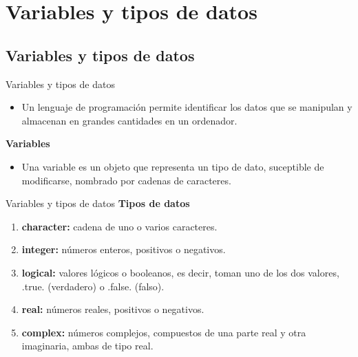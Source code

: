 
\section{Variables y tipos de datos}  


\subsection{Variables y tipos de datos}

\begin{frame}[fragile]{Variables y tipos de datos}
 \begin{itemize}[<+(0)->]
  \item Un lenguaje de programación permite identificar los datos que se manipulan y almacenan en grandes cantidades en un ordenador.
 \end{itemize}

\textbf{Variables}
 \begin{itemize}[<+(1)->]
  \item Una variable es un objeto que representa un tipo de dato, suceptible de modificarse, nombrado por cadenas de caracteres.
 \end{itemize}
\end{frame}

\begin{frame}[fragile]{Variables y tipos de datos}
\textbf{Tipos de datos}
 \begin{enumerate}[<+(1)->]
  \item \textbf{character:} cadena de uno o varios caracteres.
  \item \textbf{integer:} números enteros, positivos o negativos.
  \item \textbf{logical:} valores lógicos o booleanos, es decir, toman uno de los dos valores, .true. (verdadero) o .false. (falso).
  \item \textbf{real:} números reales, positivos o negativos.
  \item \textbf{complex:} números complejos, compuestos de una parte real y otra imaginaria, ambas de tipo real.
 \end{enumerate}
 \end{frame}

